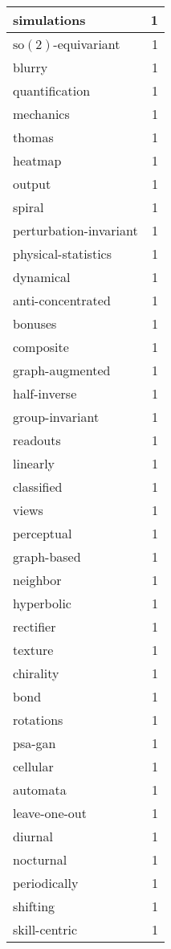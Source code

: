 \begin{table}[h]
\begin{tabular}{|l|r|}
\hline
simulations & 1 \\
\hline
$\mathrm{so}(2)$-equivariant & 1 \\
\hline
blurry & 1 \\
\hline
quantification & 1 \\
\hline
mechanics & 1 \\
\hline
thomas & 1 \\
\hline
heatmap & 1 \\
\hline
output & 1 \\
\hline
spiral & 1 \\
\hline
perturbation-invariant & 1 \\
\hline
physical-statistics & 1 \\
\hline
dynamical & 1 \\
\hline
anti-concentrated & 1 \\
\hline
bonuses & 1 \\
\hline
composite & 1 \\
\hline
graph-augmented & 1 \\
\hline
half-inverse & 1 \\
\hline
group-invariant & 1 \\
\hline
readouts & 1 \\
\hline
linearly & 1 \\
\hline
classified & 1 \\
\hline
views & 1 \\
\hline
perceptual & 1 \\
\hline
graph-based & 1 \\
\hline
neighbor & 1 \\
\hline
hyperbolic & 1 \\
\hline
rectifier & 1 \\
\hline
texture & 1 \\
\hline
chirality & 1 \\
\hline
bond & 1 \\
\hline
rotations & 1 \\
\hline
psa-gan & 1 \\
\hline
cellular & 1 \\
\hline
automata & 1 \\
\hline
leave-one-out & 1 \\
\hline
diurnal & 1 \\
\hline
nocturnal & 1 \\
\hline
periodically & 1 \\
\hline
shifting & 1 \\
\hline
skill-centric & 1 \\

\end{tabular}
\end{table}
